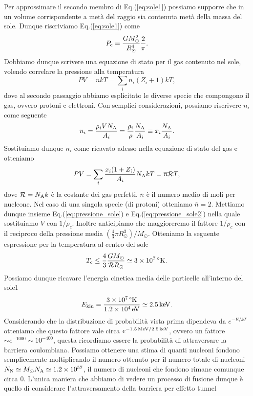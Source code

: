 Per approssimare il secondo membro di Eq.(\ref{eq:sole1}) possiamo supporre che in un volume corrispondente a metà del raggio sia contenuta metà della massa del sole. Dunque riscriviamo Eq.(\ref{eq:sole1}) come
\begin{equation}
    P_\textup{c} = \frac{G M_\odot^2}{R_\odot^4}\frac{2}{\pi}.
    \label{eq:pressione_sole}
\end{equation}
Dobbiamo dunque scrivere una equazione di stato per il gas contenuto nel sole, volendo correlare la pressione alla temperatura
\begin{equation*}
    PV = nkT = \sum_i n_i(Z_i + 1)kT,
\end{equation*}
dove al secondo passaggio abbiamo esplicitato le diverse specie che compongono il gas, ovvero protoni e elettroni. Con semplici considerazioni, possiamo riscrivere $n_i$ come seguente
\begin{equation*}
    n_i = \frac{\rho_i V N_\textup{A}}{A_i} = \frac{\rho_i}{\rho}\frac{N_\textup{A}}{A_i} \equiv x_i \frac{N_\textup{A}}{A_i}.
\end{equation*}
Sostituiamo dunque $n_i$ come ricavato adesso nella equazione di stato del gas e otteniamo 
\begin{equation}
    PV = \sum_i \frac{x_i (1 + Z_i)}{A_i}N_\textup{A} k T = \overline{n}\mathcal{R}T,
    \label{eq:pressione_sole2}
\end{equation}
dove $\mathcal{R} = N_\textup{A}k$ è la costante dei gas perfetti, $\overline{n}$ è il numero medio di moli per nucleone. Nel caso di una singola specie (di protoni) otteniamo $\overline{n} = 2$. Mettiamo dunque insieme Eq.(\ref{eq:pressione_sole}) e Eq.(\ref{eq:pressione_sole2}) nella quale sostituiamo $V$ con $1 / \rho_c$. Inoltre anticipiamo che maggioreremo il fattore $1 / \rho_c$ con il reciproco della pressione media $(\frac{4}{3} \pi R_\odot ^3) / M_\odot$. Otteniamo la seguente espressione per la temperatura al centro del sole
\begin{equation*}
    T_\textup{c} \leq \frac{4}{3}\frac{GM_\odot}{\mathcal{R}R_\odot} \simeq 3 \times 10^{7} \, ^\circ \textup{K}.
\end{equation*}
Possiamo dunque ricavare l'energia cinetica media delle particelle all'interno del sole1
\begin{equation*}
    E_\textup{kin} = \frac{3\times 10^7\,\textup{°K}}{1.2\times 10^4 \,\textup{eV}} \simeq 2.5\,\textup{keV}.
\end{equation*}
Considerando che la distribuzione di probabilità vista prima dipendeva da $e^{-E/kT}$ otteniamo che questo fattore vale circa $e^{-1.5\,\textup{MeV} / 2.5\,\textup{keV}}$, ovvero un fattore $\sim e^{-1000} \sim 10^{-400}$, questa ricordiamo essere la probabilità di attraversare la barriera coulombiana. Possiamo ottenere una stima di quanti nucleoni fondono semplicemente moltiplicando il numero ottenuto per il numero totale di nucleoni $N_\textup{N} \simeq M_\odot N_\textup{A} \simeq 1.2 \times 10^{57}$, il numero di nucleoni che fondono rimane comunque circa $0$. L'unica maniera che abbiamo di vedere un processo di fusione dunque è quello di considerare l'attraversamento della barriera per effetto tunnel
